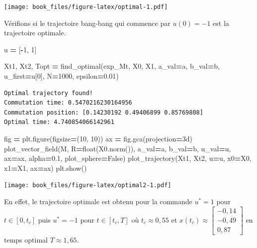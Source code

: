 \documentclass[
  french,
]{article}
\newenvironment{Shaded}{\begin{snugshade}}{\end{snugshade}}
\newcommand{\BuiltInTok}[1]{#1}
\newcommand{\DecValTok}[1]{\textcolor[rgb]{0.00,0.00,0.81}{#1}}
\newcommand{\FloatTok}[1]{\textcolor[rgb]{0.00,0.00,0.81}{#1}}
\newcommand{\NormalTok}[1]{#1}
\newcommand{\OperatorTok}[1]{\textcolor[rgb]{0.81,0.36,0.00}{\textbf{#1}}}
\newcommand{\StringTok}[1]{\textcolor[rgb]{0.31,0.60,0.02}{#1}}
\newcommand{\VariableTok}[1]{\textcolor[rgb]{0.00,0.00,0.00}{#1}}
\begin{document}
\texttt{[image: book\_files/figure-latex/optimal-1.pdf]}

Vérifions si le trajectoire bang-bang qui commence par \(u(0)=-1\)
est la trajectoire optimale.

\begin{Shaded}
\begin{Highlighting}[]
\NormalTok{u }\OperatorTok{=}\NormalTok{ [}\OperatorTok{{-}}\DecValTok{1}\NormalTok{, }\DecValTok{1}\NormalTok{]}

\NormalTok{Xt1, Xt2, Topt }\OperatorTok{=}\NormalTok{ find\_optimal(exp\_Mt, X0, X1, a\_val}\OperatorTok{=}\NormalTok{a, b\_val}\OperatorTok{=}\NormalTok{b, u\_first}\OperatorTok{=}\NormalTok{u[}\DecValTok{0}\NormalTok{], N}\OperatorTok{=}\DecValTok{1000}\NormalTok{, epsilon}\OperatorTok{=}\FloatTok{0.01}\NormalTok{)}
\end{Highlighting}
\end{Shaded}

\begin{verbatim}
Optimal trajectory found!
Commutation time: 0.5470216230164956
Commutation position: [0.14230192 0.49406899 0.85769808]
Optimal time: 4.740854066142961
\end{verbatim}

\begin{Shaded}
\begin{Highlighting}[]
\NormalTok{fig }\OperatorTok{=}\NormalTok{ plt.figure(figsize}\OperatorTok{=}\NormalTok{(}\DecValTok{10}\NormalTok{, }\DecValTok{10}\NormalTok{))}
\NormalTok{ax }\OperatorTok{=}\NormalTok{ fig.gca(projection}\OperatorTok{=}\StringTok{\textquotesingle{}3d\textquotesingle{}}\NormalTok{)}
\NormalTok{plot\_vector\_field(M, R}\OperatorTok{=}\BuiltInTok{float}\NormalTok{(X0.norm()), a\_val}\OperatorTok{=}\NormalTok{a, b\_val}\OperatorTok{=}\NormalTok{b, u\_val}\OperatorTok{=}\NormalTok{u, ax}\OperatorTok{=}\NormalTok{ax, alpha}\OperatorTok{=}\FloatTok{0.1}\NormalTok{, plot\_sphere}\OperatorTok{=}\VariableTok{False}\NormalTok{)}
\NormalTok{plot\_trajectory(Xt1, Xt2, u}\OperatorTok{=}\NormalTok{u, x0}\OperatorTok{=}\NormalTok{X0, x1}\OperatorTok{=}\NormalTok{X1, ax}\OperatorTok{=}\NormalTok{ax)}
\NormalTok{plt.show()}
\end{Highlighting}
\end{Shaded}

\texttt{[image: book\_files/figure-latex/optimal2-1.pdf]}

En effet, le trajectoire optimale est obtenu pour la commande
\(u^*=1\) pour \(t\in[0,t_c]\) puis \(u^*=-1\) pour \(t\in[t_c,T]\)
où \(t_c\approx 0,55\)
et \(x(t_c)\approx\begin{bmatrix}-0,14\\-0,49\\0,87\end{bmatrix}\)
en temps optimal \(T\approx 1,65\).
\end{document}
